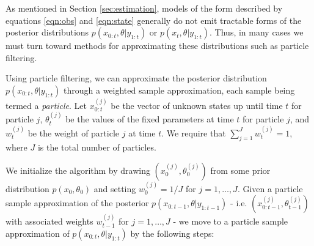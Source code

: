 \documentclass{article}
\begin{document}
As mentioned in Section \ref{sec:estimation}, models of the form described by equations \eqref{eqn:obs} and \eqref{eqn:state} generally do not emit tractable forms of the posterior distributions $p(x_{0:t},\theta|y_{1:t})$ or $p(x_t,\theta|y_{1:t})$. Thus, in many cases we must turn toward methods for approximating these distributions such as particle filtering.

Using particle filtering, we can approximate the posterior distribution $p(x_{0:t},\theta|y_{1:t})$ through a weighted sample approximation, each sample being termed a \emph{particle}. Let $x^{(j)}_{0:t}$ be the vector of unknown states up until time $t$ for particle $j$, $\theta^{(j)}_t$ be the values of the fixed parameters at time $t$ for particle $j$, and $w^{(j)}_t$ be the weight of particle $j$ at time $t$. We require that $\sum_{j=1}^J w^{(j)}_t = 1$, where $J$ is the total number of particles.

We initialize the algorithm by drawing $\left(x^{(j)}_0, \theta^{(j)}_0\right)$ from some prior distribution $p(x_0,\theta_0)$ and setting $w^{(j)}_0 = 1 / J$ for $j = 1,\ldots,J$. Given a particle sample approximation of the posterior $p(x_{0:t-1},\theta|y_{1:t-1})$ - i.e. $\left(x^{(j)}_{0:t-1},\theta^{(j)}_{t-1}\right)$ with associated weights $w^{(j)}_{t-1}$ for $j=1,\ldots,J$ - we move to a particle sample approximation of $p(x_{0:t},\theta|y_{1:t})$ by the following steps:
\end{document}
